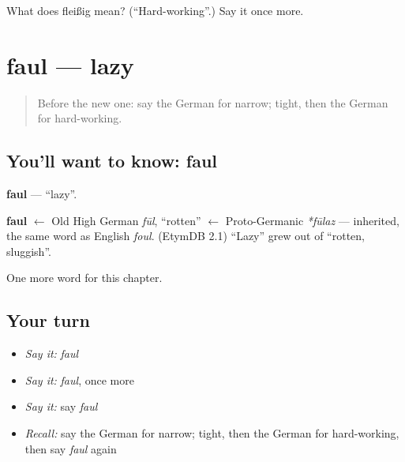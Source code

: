 \begin{tcolorbox}[breakable,colback=teal!4,colframe=teal!35!black,title={Before you move on}]
What does fleißig mean? (\textquotedblleft{}Hard-working\textquotedblright{}.) Say it once more.
\end{tcolorbox}
\section[faul]{faul — lazy}

\label{lesson:GE-C132-faul}



\begin{quote}
Before the new one: say the German for narrow; tight, then the German for hard-working.
\end{quote}

\subsection*{You'll want to know: faul}
\textbf{faul} — \textquotedblleft{}lazy\textquotedblright{}.

\begin{cousinweb}
\textbf{faul} $\leftarrow$ Old High German \emph{fūl}, \textquotedblleft{}rotten\textquotedblright{} $\leftarrow$ Proto-Germanic \emph{*fūlaz} — inherited, the same word as English \emph{foul}. (EtymDB 2.1) \textquotedblleft{}Lazy\textquotedblright{} grew out of \textquotedblleft{}rotten, sluggish\textquotedblright{}.
\end{cousinweb}

\begin{grammarlens}[title={What you've built}]
One more word for this chapter.
\end{grammarlens}

\subsection*{Your turn}
\begin{itemize}
\raggedright
  \item \emph{Say it:} \emph{faul}
  \item \emph{Say it:} \emph{faul}, once more
  \item \emph{Say it:} say \emph{faul}
  \item \emph{Recall:} say the German for narrow; tight, then the German for hard-working, then say \emph{faul} again
\end{itemize}

